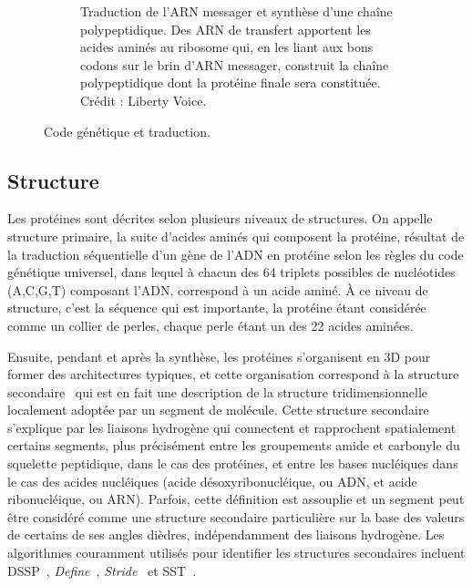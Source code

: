 \begin{appendices}
\begin{figure}[htb]
\begin{subfigure}[t]{0.54\textwidth}
			\caption[Traduction de l'ARN messager en protéine]{Traduction de l'ARN messager et synthèse d'une chaîne polypeptidique. Des ARN de transfert apportent les acides aminés au ribosome qui, en les liant aux bons codons sur le brin d'ARN messager, construit la chaîne polypeptidique dont la protéine finale sera constituée. Crédit : Liberty Voice\footnotemark{}.}
			\label{fig:translation}
		\end{subfigure}
		\label{fig:codeTrans}
		\caption{Code génétique et traduction.}
	\end{figure}
	
	\addtocounter{footnote}{-1}
	\addtocounter{footnote}{1}
	
	\subsection{Structure}
	Les protéines sont décrites selon plusieurs niveaux de structures. On appelle structure primaire, la suite d'acides aminés qui composent la protéine, résultat de la traduction séquentielle d'un gène de l'ADN en protéine selon les règles du code génétique universel, dans lequel à chacun des 64 triplets possibles de nucléotides (A,C,G,T) composant l'ADN, correspond à un acide aminé. À ce niveau de structure, c'est la séquence qui est importante, la protéine étant considérée comme un collier de perles, chaque perle étant un des 22 acides aminées.
	
	Ensuite, pendant et après la synthèse, les protéines s'organisent en 3D pour former des architectures typiques, et cette organisation correspond à la structure secondaire~\cite{foltmann1981protein} qui est en fait une description de la structure tridimensionnelle localement adoptée par un segment de molécule. Cette structure secondaire s'explique par les liaisons hydrogène qui connectent et rapprochent spatialement certains segments, plus précisément entre les groupements amide et carbonyle du squelette peptidique, dans le cas des protéines, et entre les bases nucléiques dans le cas des acides nucléiques (acide désoxyribonucléique, ou ADN, et acide ribonucléique, ou ARN). Parfois, cette définition est assouplie et un segment peut être considéré comme une structure secondaire particulière sur la base des valeurs de certains de ses angles dièdres, indépendamment des liaisons hydrogène. Les algorithmes couramment utilisés pour identifier les structures secondaires incluent DSSP~\cite{kabsch1983dictionary}, \emph{Define}~\cite{richards1988identification}, \emph{Stride}~\cite{frishman1995knowledge} et SST~\cite{konagurthu2012minimum}.
		

\end{appendices}
